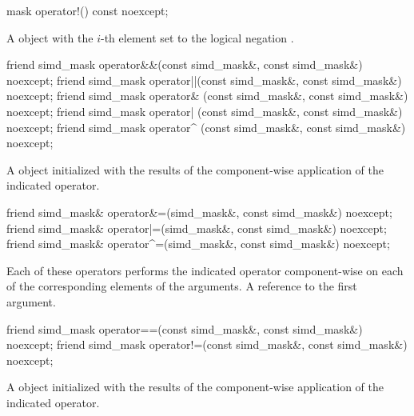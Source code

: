 \begin{itemdecl}
mask operator!() const noexcept;
\end{itemdecl}
\begin{itemdescr}
  \pnum\returns A \mask object with the $i$-th element set to the logical negation \foralli.
\end{itemdescr}


\begin{itemdecl}
friend simd_mask operator&&(const simd_mask&, const simd_mask&) noexcept;
friend simd_mask operator||(const simd_mask&, const simd_mask&) noexcept;
friend simd_mask operator& (const simd_mask&, const simd_mask&) noexcept;
friend simd_mask operator| (const simd_mask&, const simd_mask&) noexcept;
friend simd_mask operator^ (const simd_mask&, const simd_mask&) noexcept;
\end{itemdecl}
\begin{itemdescr}
  \pnum\returns A \mask object initialized with the results of the component-wise application of the indicated operator.
\end{itemdescr}

\begin{itemdecl}
friend simd_mask& operator&=(simd_mask&, const simd_mask&) noexcept;
friend simd_mask& operator|=(simd_mask&, const simd_mask&) noexcept;
friend simd_mask& operator^=(simd_mask&, const simd_mask&) noexcept;
\end{itemdecl}
\begin{itemdescr}
  \pnum\effects Each of these operators performs the indicated operator component-wise on each of the corresponding elements of the arguments.
  \pnum\returns A reference to the first argument.
\end{itemdescr}

\begin{itemdecl}
friend simd_mask operator==(const simd_mask&, const simd_mask&) noexcept;
friend simd_mask operator!=(const simd_mask&, const simd_mask&) noexcept;
\end{itemdecl}
\begin{itemdescr}
  \pnum\returns A \mask object initialized with the results of the component-wise application of the indicated operator.
\end{itemdescr}

